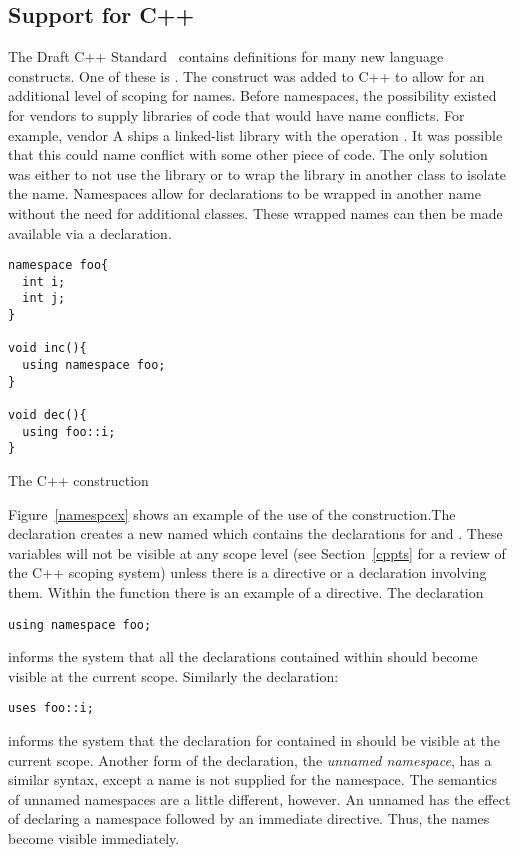 \subsection{Support for C++ }
\label{namspcimp}
The Draft C++ Standard~\cite{C++Apr95} contains definitions for many
new language constructs. One of these is . The
 construct was added to C++ to allow for 
an additional level of scoping for names. Before namespaces, the
possibility existed for vendors to supply libraries of code that would
have name conflicts. For example, vendor A ships a linked-list library
with the operation . It was possible that this
 could name conflict with some other piece of
code. The only solution was either to not use the library or to wrap
the library in another class to isolate the name. Namespaces allow for
declarations to be wrapped in another name without the need for
additional classes. These wrapped names can then be made available via
a  declaration.
\begin{BFIGURE}
\begin{verbatim}
namespace foo{
  int i;
  int j;
}

void inc(){
  using namespace foo;
}

void dec(){
  using foo::i;
}
\end{verbatim}
\caption{The C++  construction}
\label{namespcex}
\end{BFIGURE}

Figure~\ref{namespcex} shows an example of the use of
the  construction.The  declaration creates a new  named
 which contains the declarations for  and
. These variables will not be visible at any scope level
(see Section~\ref{cppts} for a review of the C++ scoping system)
unless there is a  directive or a
 declaration involving them. Within the function
 there is an example of a 
directive. The declaration 
\begin{verbatim} 
using namespace foo; 
\end{verbatim}
informs the system that all the declarations contained within
 should become visible at the current
scope. Similarly the  declaration: 
\begin{verbatim} 
uses foo::i;
\end{verbatim} 
informs the system that the declaration for  contained in
 should be visible at the current
scope. Another form of the  declaration, the
\emph{unnamed namespace}, has a similar syntax, except a name is not
supplied for the namespace. The semantics of unnamed namespaces
are a little different, however. An unnamed  has the effect
of declaring a namespace followed by an immediate 
directive. Thus, the names become visible immediately.


